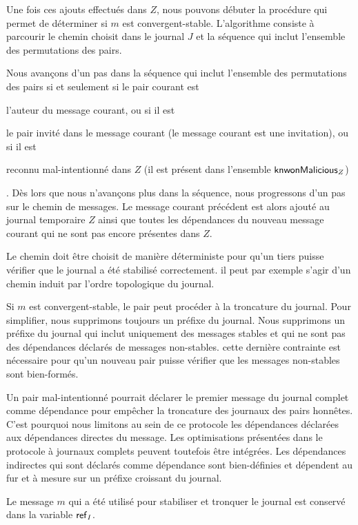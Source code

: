 Une fois ces ajouts effectués dans $Z$, nous pouvons débuter la procédure qui permet de déterminer si $m$ est convergent-stable.
L'algorithme consiste à parcourir le chemin choisit dans le journal $J$ et la séquence qui inclut l'ensemble des permutations des pairs.

Nous avançons d'un pas dans la séquence qui inclut l'ensemble des permutations des pairs si et seulement si le pair courant est \begin{inlinelist}\item l'auteur du message courant, ou si il est \item le pair invité dans le message courant (le message courant est une invitation), ou si il est \item reconnu mal-intentionné dans $Z$ (il est présent dans l'ensemble $\operatorname{\mathsf{knwonMalicious}}_Z$) \end{inlinelist}.
Dès lors que nous n'avançons plus dans la séquence, nous progressons d'un pas sur le chemin de messages.
Le message courant précédent est alors ajouté au journal temporaire $Z$ ainsi que toutes les dépendances du nouveau message courant qui ne sont pas encore présentes dans $Z$.


Le chemin doit être choisit de manière déterministe pour qu'un tiers puisse vérifier que le journal a été stabilisé correctement.
il peut par exemple s'agir d'un chemin induit par l'ordre topologique du journal.

Si $m$ est convergent-stable, le pair peut procéder à la troncature du journal.
Pour simplifier, nous supprimons toujours un préfixe du journal.
Nous supprimons un préfixe du journal qui inclut uniquement des messages stables et qui ne sont pas des dépendances déclarés de messages non-stables.
cette dernière contrainte est nécessaire pour qu'un nouveau pair puisse vérifier que les messages non-stables sont bien-formés.

Un pair mal-intentionné pourrait déclarer le premier message du journal complet comme dépendance pour empêcher la troncature des journaux des pairs honnêtes.
C'est pourquoi nous limitons au sein de ce protocole les dépendances déclarées aux dépendances directes du message.
Les optimisations présentées dans le protocole à journaux complets peuvent toutefois être intégrées.
Les dépendances indirectes qui sont déclarés comme dépendance sont bien-définies et dépendent au fur et à mesure sur un préfixe croissant du journal.

Le message $m$ qui a été utilisé pour stabiliser et tronquer le journal est conservé dans la variable $\operatorname{\mathsf{ref}}_I$.

